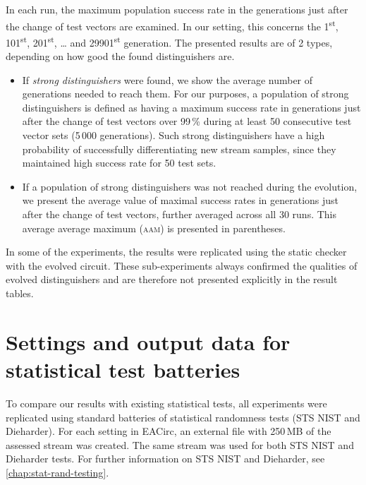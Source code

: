 \documentclass[12pt,oneside]{fithesis2}		%
\renewcommand{\_}{\leavevmode \kern0.0em\vbox{\hrule width0.4em}}
\newcommand{\squarebullet}{\textcolor{black}{\raisebox{0.15em}{\rule{4pt}{4pt}}}}
\newenvironment{myItemize}{
  \begin{itemize}[leftmargin=2em,rightmargin=1em,itemsep=\parskip ,parsep=0em,topsep=0em,partopsep=0em]
  \renewcommand{\labelitemi}{\squarebullet}
  \renewcommand{\labelitemii}{$\diamond$}
}{
  \end{itemize}
}
\begin{document}
In each run, the maximum population success rate in the generations just after the change of test vectors are examined.
In our setting, this concerns the 1\textsuperscript{st}, 101\textsuperscript{st}, 201\textsuperscript{st}, \dots{} 
and 29901\textsuperscript{st} generation.
The presented results are of 2 types, depending on how good the found distinguishers are.
\begin{myItemize}
\item If \textit{strong distinguishers} were found, we show the average number of generations needed
to reach them. For our purposes, a population of strong distinguishers is defined as having a maximum success rate in generations just
after the change of test vectors over 99\,\% during at least 50 consecutive test vector sets (5\,000 generations).
Such strong distinguishers have a high probability of successfully differentiating new stream samples, since they maintained high
success rate for 50 test sets.
\item If a population of strong distinguishers was not reached during the evolution, 
we present the average value of maximal success rates in generations just after the change of test vectors,
further averaged across all 30 runs. This average average maximum (\textsc{aam}) is presented in parentheses.
\end{myItemize}

\noindent
In some of the experiments, the results were replicated using the static checker with the evolved circuit.
These sub-experiments always confirmed the qualities of evolved distinguishers and are therefore not presented explicitly
in the result tables.

\section{Settings and output data for statistical test batteries}
\label{sec:settings-statistics}

To compare our results with existing statistical tests, all experiments were replicated using standard batteries of statistical
randomness tests (STS NIST and Dieharder). 
For each setting in EACirc, an external file with 250\,MB of the assessed stream was created.
The same stream was used for both STS NIST and Dieharder tests. For further information on STS NIST and Dieharder, 
see \autoref{chap:stat-rand-testing}.
\end{document}
